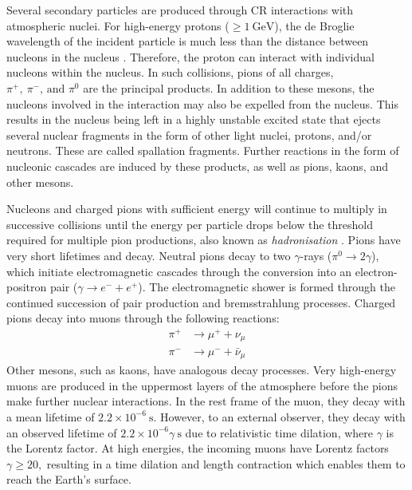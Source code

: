 Several secondary particles are produced through CR interactions with atmospheric nuclei. For high-energy protons ($\geq 1~\text{GeV}$), the de Broglie wavelength of the incident particle is much less than the distance between nucleons in the nucleus \cite{Longair_2011}. Therefore, the proton can interact with individual nucleons within the nucleus. In such collisions, pions of all charges, $\pi^+,\:\pi^-\text{, and }\pi^0$ are the principal products. In addition to these mesons, the nucleons involved in the interaction may also be expelled from the nucleus. This results in the nucleus being left in a highly unstable excited state that ejects several nuclear fragments in the form of other light nuclei, protons, and/or neutrons. These are called spallation fragments. Further reactions in the form of nucleonic cascades are induced by these products, as well as pions, kaons, and other mesons.

Nucleons and charged pions with sufficient energy will continue to multiply in successive collisions until the energy per particle drops below the threshold required for multiple pion productions, also known as \textit{hadronisation} \cite{Longair_2011}. Pions have very short lifetimes and decay. Neutral pions decay to two $\gamma$-rays ($\pi^0\rightarrow2\gamma$), which initiate electromagnetic cascades through the conversion into an electron-positron pair ($\gamma\rightarrow e^-+e^+$). The electromagnetic shower is formed through the continued succession of pair production and bremsstrahlung processes. Charged pions decay into muons through the following reactions:
\begin{equation}
\begin{split}
    \pi^+&\rightarrow\mu^++\nu_\mu \\
    \pi^-&\rightarrow\mu^-+\bar\nu_\mu
\end{split}
\end{equation}
Other mesons, such as kaons, have analogous decay processes. Very high-energy muons are produced in the uppermost layers of the atmosphere before the pions make further nuclear interactions. 
In the rest frame of the muon, they decay with a mean lifetime of $2.2\times10^{-6}~\text{s}$. However, to an external observer, they decay with an observed lifetime of $2.2\times10^{-6}\gamma~\text{s}$ due to relativistic time dilation, where $\gamma$ is the Lorentz factor. At high energies, the incoming muons have Lorentz factors $\gamma\geq20,$ resulting in a time dilation and length contraction which enables them to reach the Earth's surface. 

